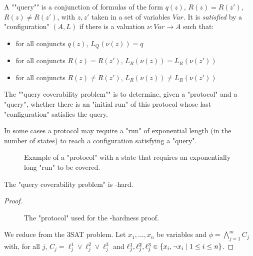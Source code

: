 \begin{definition}
	A ""query"" is a conjunction of formulas of the form $q(z)$, $R(z) = R(z')$, $R(z) \neq R(z')$, with $z, z'$ taken in a set of variables $Var$.
	It is \emph{satisfied} by a "configuration" $(A, L)$ if there is a valuation $\nu : Var \to A$ such that:
	\begin{itemize}
		\item for all conjuncts $q(z)$, $L_Q(\nu(z)) = q$
		
		\item for all conjuncts $R(z) = R(z')$, $L_R(\nu(z)) = L_R(\nu(z'))$
		
		\item for all conjuncts $R(z) \neq R(z')$, $L_R(\nu(z)) \neq L_R(\nu(z'))$
	\end{itemize}

	\AP The ""query coverability problem"" is to determine, given a "protocol" and a "query", whether there is an "initial run" of this protocol whose last "configuration" satisfies the query.
\end{definition}

\begin{ex}
	In some cases a protocol may require a "run" of exponential length (in the number of states) to reach a configuration satisfying a "query".
	
	\begin{figure}
		
		\label{fig:exp-run}
		\caption{Example of a "protocol" with a state that requires an exponentially long "run" to be covered.}
	\end{figure}
	
\end{ex}

\begin{proposition}
	The "query coverability problem" is \np-hard.
\end{proposition}

\begin{proof}
	\begin{figure}
		
		\label{fig:np-hard}
		\caption{The "protocol" used for the \np-hardness proof.}
	\end{figure}
	
	We reduce from the 3SAT problem.
	Let $x_1, \ldots, x_n$ be variables and $\phi = \bigwedge_{j=1}^m C_j$ with, for all $j$, $C_j = \ell_j^1 \lor \ell_j^2 \lor \ell_j^3$ and $\ell_j^1, \ell_j^2, \ell_j^3 \in \{x_i, \neg x_i \mid 1 \leq i \leq n\}$. 
	
\end{proof}

